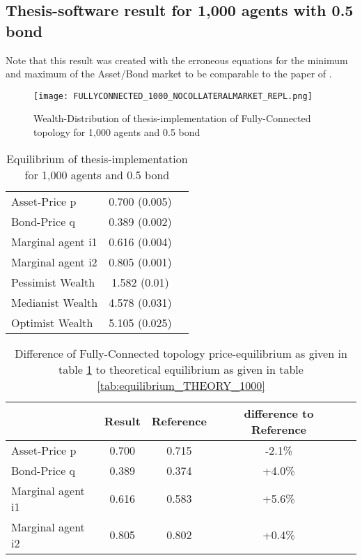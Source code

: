 \documentclass[Bachelorarbeit.tex]{subfiles}
\begin{document}
\subsection{Thesis-software result for 1,000 agents with 0.5 bond}
Note that this result was created with the erroneous equations for the minimum and maximum of the Asset/Bond market to be comparable to the paper of \cite{Breuer2015}.

\begin{figure}[H]
	\centering
  \texttt{[image: FULLYCONNECTED\_1000\_NOCOLLATERALMARKET\_REPL.png]}
	\caption{Wealth-Distribution of thesis-implementation of Fully-Connected topology for 1,000 agents and 0.5 bond}
	\label{fig:wealth_FULLYCONNECTED_1000_NOCOLLATERALMARKET_REPL}
\end{figure}

\begin{table}[H]
	\centering
	\caption{Equilibrium of thesis-implementation for 1,000 agents and 0.5 bond}
	\begin{tabular} { l c r }
		\hline
		Asset-Price p & 0.700 (0.005) \\
		Bond-Price q & 0.389 (0.002) \\
		Marginal agent i1 & 0.616 (0.004) \\
		Marginal agent i2 & 0.805 (0.001) \\
		\hline
		Pessimist Wealth & 1.582 (0.01) \\
		Medianist Wealth & 4.578 (0.031) \\
		Optimist Wealth & 5.105 (0.025) \\
		\hline
	\end{tabular}
	\label{tab:equilibrium_THESIS_1000_50_REPL}
\end{table}

\begin{table}[H]
	\caption{Difference of Fully-Connected topology price-equilibrium as given in table \ref{tab:equilibrium_THESIS_1000_50_REPL} to theoretical equilibrium as given in table \ref{tab:equilibrium_THEORY_1000}}
	\centering
	\begin{tabular} { l c c c r }
		& Result & Reference & difference to Reference \\
		\hline
		Asset-Price p & 0.700 & 0.715 & -2.1\% \\
		Bond-Price q & 0.389 & 0.374 & +4.0\% \\
		Marginal agent i1 & 0.616  & 0.583 & +5.6\% \\
		Marginal agent i2 & 0.805 & 0.802 & +0.4\% \\
		\hline
	\end{tabular}
\end{table} 
\end{document}
